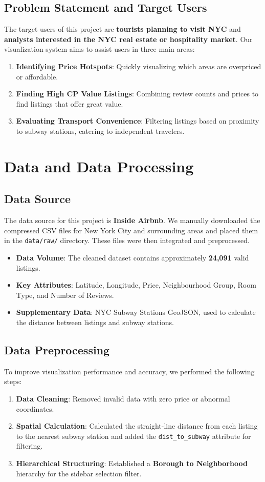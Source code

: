 \documentclass[journal, a4paper]{IEEEtran}
\begin{document}
\subsection{Problem Statement and Target Users}
The target users of this project are \textbf{tourists planning to visit NYC} and \textbf{analysts interested in the NYC real estate or hospitality market}.
Our visualization system aims to assist users in three main areas:
\begin{enumerate}
    \item \textbf{Identifying Price Hotspots}: Quickly visualizing which areas are overpriced or affordable.
    \item \textbf{Finding High CP Value Listings}: Combining review counts and prices to find listings that offer great value.
    \item \textbf{Evaluating Transport Convenience}: Filtering listings based on proximity to subway stations, catering to independent travelers.
\end{enumerate}

\section{Data and Data Processing}
\subsection{Data Source}
The data source for this project is \textbf{Inside Airbnb}. We manually downloaded the compressed CSV files for New York City and surrounding areas and placed them in the \texttt{data/raw/} directory. These files were then integrated and preprocessed.
\begin{itemize}
    \item \textbf{Data Volume}: The cleaned dataset contains approximately \textbf{24,091} valid listings.
    \item \textbf{Key Attributes}: Latitude, Longitude, Price, Neighbourhood Group, Room Type, and Number of Reviews.
    \item \textbf{Supplementary Data}: NYC Subway Stations GeoJSON, used to calculate the distance between listings and subway stations.
\end{itemize}

\subsection{Data Preprocessing}
To improve visualization performance and accuracy, we performed the following steps:
\begin{enumerate}
    \item \textbf{Data Cleaning}: Removed invalid data with zero price or abnormal coordinates.
    \item \textbf{Spatial Calculation}: Calculated the straight-line distance from each listing to the nearest subway station and added the \texttt{dist\_to\_subway} attribute for filtering.
    \item \textbf{Hierarchical Structuring}: Established a \textbf{Borough to Neighborhood} hierarchy for the sidebar selection filter.
\end{enumerate}
\end{document}
